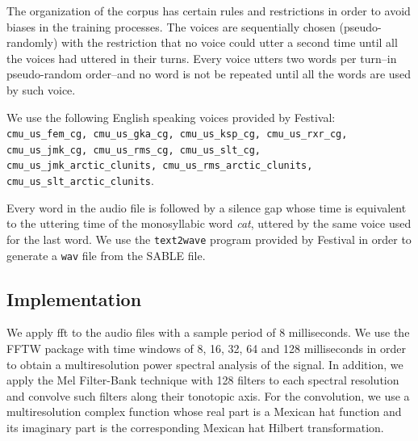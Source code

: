 \documentclass[10pt,letterpaper]{article}
\begin{document}
The organization of the corpus has certain rules and restrictions in order to avoid biases in the training processes.
The voices are sequentially chosen (pseudo-randomly) with the restriction that no voice could utter a second time until all the voices had uttered in their turns. Every voice utters two words per turn--in pseudo-random order--and no word is not be repeated until all the words are used by such voice. 

We use the following English speaking voices provided by Festival: \texttt{cmu\_us\_fem\_cg, cmu\_us\_gka\_cg, cmu\_us\_ksp\_cg, cmu\_us\_rxr\_cg, cmu\_us\_jmk\_cg, cmu\_us\_rms\_cg, cmu\_us\_slt\_cg, cmu\_us\_jmk\_arctic\_clunits, cmu\_us\_rms\_arctic\_clunits, cmu\_us\_slt\_arctic\_clunits}.

Every word in the audio file is followed by a silence gap whose time is equivalent to the uttering time of the monosyllabic word \textit{cat}, uttered by the same voice used for the last word. We use the \texttt{text2wave} program provided by Festival in order to generate a \texttt{wav} file from the SABLE file.

\subsection*{ Implementation}

We apply \gls{fft} to the audio files with a sample period of 8 milliseconds.
We use the FFTW package \cite{FFTW05, fftw}
with time windows of 8, 16, 32, 64 and 128 milliseconds in order to obtain
a multiresolution power spectral analysis of the signal.
In addition, we apply the Mel Filter-Bank technique with 128 filters to each
spectral resolution and convolve such filters along their tonotopic axis.
For the convolution, we use a multiresolution complex function whose real part
is a Mexican hat function and its imaginary part is the corresponding Mexican hat Hilbert transformation.

\end{document}
